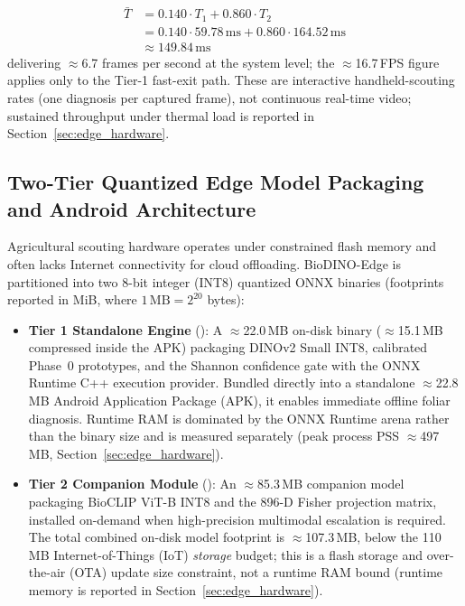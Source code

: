 \documentclass[preprint,12pt]{elsarticle}
\begin{document}
\begin{itemize}
    \begin{align}
        \bar{T} &= 0.140 \cdot T_1 + 0.860 \cdot T_2 \nonumber \\
        &= 0.140 \cdot 59.78\,\text{ms} + 0.860 \cdot 164.52\,\text{ms} \nonumber \\
        &\approx 149.84\,\text{ms}
    \end{align}
    delivering $\approx$6.7 frames per second at the system level; the $\approx$16.7\,FPS figure applies only to the Tier-1 fast-exit path. These are interactive handheld-scouting rates (one diagnosis per captured frame), not continuous real-time video; sustained throughput under thermal load is reported in Section~\ref{sec:edge_hardware}.
\end{itemize}

\subsection{Two-Tier Quantized Edge Model Packaging and Android Architecture}
\label{sec:packaging}
Agricultural scouting hardware operates under constrained flash memory and often lacks Internet connectivity for cloud offloading. BioDINO-Edge is partitioned into two 8-bit integer (INT8) quantized ONNX binaries (footprints reported in MiB, where $1\,\text{MB}=2^{20}$ bytes):
\begin{itemize}
    \item \textbf{Tier 1 Standalone Engine} (): A $\approx$22.0\,MB on-disk binary ($\approx$15.1\,MB compressed inside the APK) packaging DINOv2 Small INT8, calibrated Phase~0 prototypes, and the Shannon confidence gate with the ONNX Runtime C++ execution provider. Bundled directly into a standalone $\approx$22.8\,MB Android Application Package (APK), it enables immediate offline foliar diagnosis. Runtime RAM is dominated by the ONNX Runtime arena rather than the binary size and is measured separately (peak process PSS $\approx$497\,MB, Section~\ref{sec:edge_hardware}).
    \item \textbf{Tier 2 Companion Module} (): An $\approx$85.3\,MB companion model packaging BioCLIP ViT-B INT8 and the 896-D Fisher projection matrix, installed on-demand when high-precision multimodal escalation is required. The total combined on-disk model footprint is $\approx$107.3\,MB, below the 110\,MB Internet-of-Things (IoT) \emph{storage} budget; this is a flash storage and over-the-air (OTA) update size constraint, not a runtime RAM bound (runtime memory is reported in Section~\ref{sec:edge_hardware}).
\end{itemize}
\end{document}

